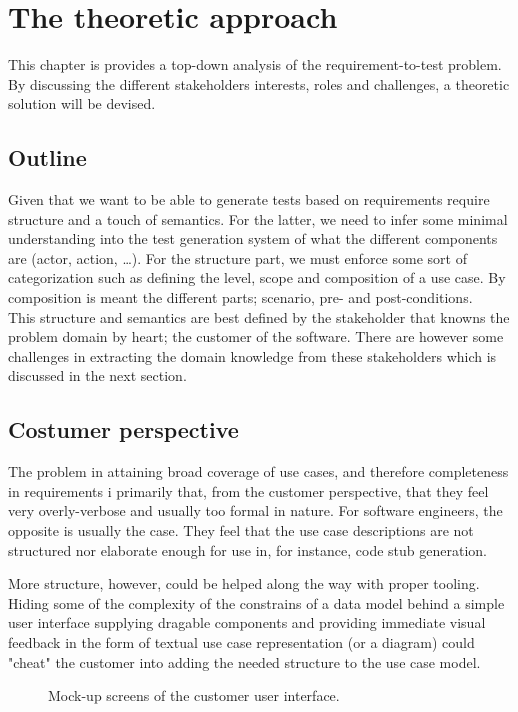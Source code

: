 
\chapter{The theoretic approach}
This chapter is provides a top-down analysis of the requirement-to-test problem. By discussing the different stakeholders interests, roles and challenges, a theoretic solution will be devised.

\section{Outline}
Given that we want to be able to generate tests based on requirements require structure and a touch of semantics. For the latter, we need to infer some minimal understanding into the test generation system of what the different components are (actor, action, \dots). For the structure part, we must enforce some sort of categorization such as defining the level, scope and composition of a use case. By composition is meant the different parts; scenario, pre- and post-conditions.\\
This structure and semantics are best defined by the stakeholder that knowns the problem domain by heart; the customer of the software. There are however some challenges in extracting the domain knowledge from these stakeholders which is discussed in the next section.

\section{Costumer perspective}
The problem in attaining broad coverage of use cases, and therefore completeness in requirements i primarily that, from the customer perspective, that they feel very overly-verbose and usually too formal in nature. For software engineers, the opposite is usually the case. They feel that the use case descriptions are not structured nor elaborate enough for use in, for instance, code stub generation.

More structure, however, could be helped along the way with proper tooling. Hiding some of the complexity of the constrains of a data model behind a simple user interface supplying dragable components and providing immediate visual feedback in the form of textual use case representation (or a diagram) could "cheat" the customer into adding the needed structure to the use case model.
\begin{figure}[!htbp]
  \centering
    
  \caption{Mock-up screens of the customer user interface.}
\end{figure}


